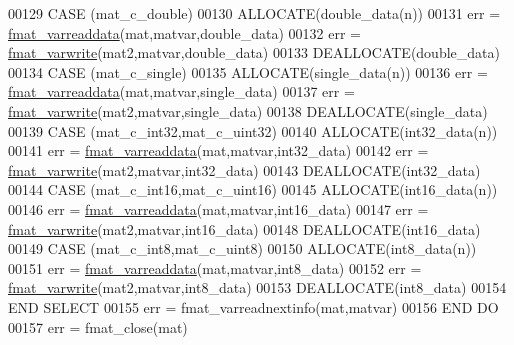 \begin{DoxyCode}
00129                     \textcolor{keywordflow}{CASE} (mat\_c\_double)
00130                         \textcolor{keyword}{ALLOCATE}(double\_data(n))
00131                         err = \hyperlink{interfacematio_1_1fmat__varreaddata}{fmat\_varreaddata}(mat,matvar,double\_data)
00132                         err = \hyperlink{interfacematio_1_1fmat__varwrite}{fmat\_varwrite}(mat2,matvar,double\_data)
00133                         \textcolor{keyword}{DEALLOCATE}(double\_data)
00134                     \textcolor{keywordflow}{CASE} (mat\_c\_single)
00135                         \textcolor{keyword}{ALLOCATE}(single\_data(n))
00136                         err = \hyperlink{interfacematio_1_1fmat__varreaddata}{fmat\_varreaddata}(mat,matvar,single\_data)
00137                         err = \hyperlink{interfacematio_1_1fmat__varwrite}{fmat\_varwrite}(mat2,matvar,single\_data)
00138                         \textcolor{keyword}{DEALLOCATE}(single\_data)
00139                     \textcolor{keywordflow}{CASE} (mat\_c\_int32,mat\_c\_uint32)
00140                         \textcolor{keyword}{ALLOCATE}(int32\_data(n))
00141                         err = \hyperlink{interfacematio_1_1fmat__varreaddata}{fmat\_varreaddata}(mat,matvar,int32\_data)
00142                         err = \hyperlink{interfacematio_1_1fmat__varwrite}{fmat\_varwrite}(mat2,matvar,int32\_data)
00143                         \textcolor{keyword}{DEALLOCATE}(int32\_data)
00144                     \textcolor{keywordflow}{CASE} (mat\_c\_int16,mat\_c\_uint16)
00145                         \textcolor{keyword}{ALLOCATE}(int16\_data(n))
00146                         err = \hyperlink{interfacematio_1_1fmat__varreaddata}{fmat\_varreaddata}(mat,matvar,int16\_data)
00147                         err = \hyperlink{interfacematio_1_1fmat__varwrite}{fmat\_varwrite}(mat2,matvar,int16\_data)
00148                         \textcolor{keyword}{DEALLOCATE}(int16\_data)
00149                     \textcolor{keywordflow}{CASE} (mat\_c\_int8,mat\_c\_uint8)
00150                         \textcolor{keyword}{ALLOCATE}(int8\_data(n))
00151                         err = \hyperlink{interfacematio_1_1fmat__varreaddata}{fmat\_varreaddata}(mat,matvar,int8\_data)
00152                         err = \hyperlink{interfacematio_1_1fmat__varwrite}{fmat\_varwrite}(mat2,matvar,int8\_data)
00153                         \textcolor{keyword}{DEALLOCATE}(int8\_data)
00154 \textcolor{keywordflow}{                END SELECT}
00155                 err = fmat\_varreadnextinfo(mat,matvar)
00156 \textcolor{keywordflow}{            END DO}
00157             err = fmat\_close(mat)

\end{DoxyCode}
